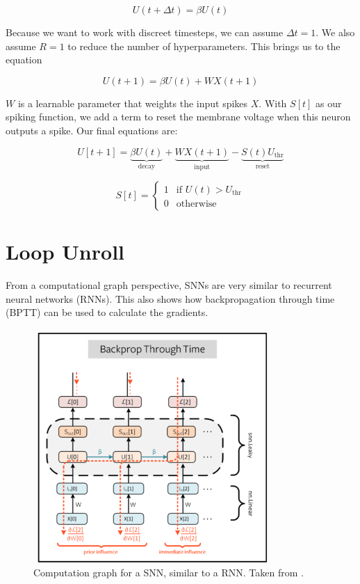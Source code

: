 \documentclass [MS] {UCLAthesis}
\begin{document}
$$ U(t + \Delta t) = \beta U(t) $$

Because we want to work with discreet timesteps, we can assume $\Delta t = 1$. We also assume $R=1$ to reduce the number of hyperparameters. This brings us to the equation

$$ U(t+1) = \beta U(t) + W X(t+1) $$

$W$ is a learnable parameter that weights the input spikes $X$. With $S[t]$ as our spiking function, we add a term to reset the membrane voltage when this neuron outputs a spike. Our final equations are:

$$ U[t+1] = \underbrace{\beta U(t)}_{\text{decay}}
+ \underbrace{W X(t+1)}_{\text{input}}
- \underbrace{S(t)U_\text{thr}}_{\text{reset}} 
$$

$$
S[t] = \begin{cases} 
      1 & \text{if } U(t) > U_\text{thr} \\
      0 & \text{otherwise }
      \end{cases}
$$


\section{Loop Unroll}

From a computational graph perspective, SNNs are very similar to recurrent neural networks (RNNs). This also shows how backpropagation through time (BPTT) can be used to calculate the gradients.

\begin{figure}
    \centering
    \includegraphics[width=0.8\textwidth]{snnTorch_bptt.png}
    \caption[Unrolled computation graph for a SNN]{Computation graph for a SNN, similar to a RNN. Taken from \citep{snnTorch}.}
    \label{fig:snn_loop_unroll}
\end{figure}
\end{document}

